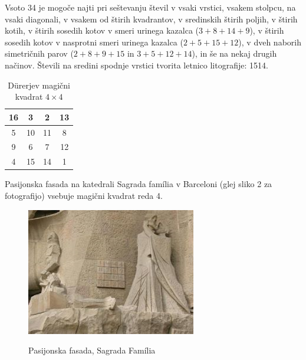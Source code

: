 \documentclass[a4paper,12pt]{article}
\begin{document}

Vsoto 34 je mogoče najti pri seštevanju števil v vsaki vrstici, vsakem stolpcu,
na vsaki diagonali, v vsakem od štirih kvadrantov, v sredinskih štirih poljih,
v štirih kotih, v štirih sosedih kotov v smeri urinega kazalca ($3+8+14+9$), v
štirih sosedih kotov v nasprotni smeri urinega kazalca ($2+5+15+12$), v dveh naborih
simetričnih parov ($2+8+9+15$ in $3+5+12+14$), in še na nekaj drugih načinov.
Števili na sredini spodnje vrstici tvorita letnico litografije: 1514.
\begin{table}
   \centering
   \caption{Dürerjev magični kvadrat $4\times 4$}
   \begin{tabular}{|c|c|c|c|}
      \hline
         16 &  3 &  2 & 13 \\\hline
          5 & 10 & 11 &  8 \\\hline
          9 &  6 &  7 & 12 \\\hline
          4 & 15 & 14 &  1 \\\hline
     
      
   \end{tabular}
\end{table}

Pasijonska fasada na katedrali Sagrada família v Barceloni
(glej sliko 2 za fotografijo) vsebuje magični kvadrat reda 4.
\begin{figure}
   \centering
   \caption{Pasijonska fasada, Sagrada Família}
   \includegraphics{sagrada.png}
   \label{fig:sagrada}

\end{figure}
\end{document}
